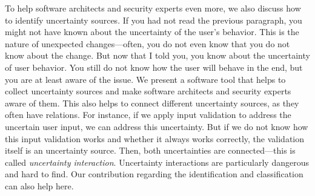 To help software architects and security experts even more, we also discuss how to identify uncertainty sources.
If you had not read the previous paragraph, you might not have known about the uncertainty of the user's behavior.
This is the nature of unexpected changes---often, you do not even know that you do not know about the change.
But now that I told you, you know about the uncertainty of user behavior.
You still do not know how the user will behave in the end, but you are at least aware of the issue.
We present a software tool that helps to collect uncertainty sources and make software architects and security experts aware of them.
This also helps to connect different uncertainty sources, as they often have relations.
For instance, if we apply input validation to address the uncertain user input, we can address this uncertainty.
But if we do not know how this input validation works and whether it always works correctly, the validation itself is an uncertainty source.
Then, both uncertainties are connected---this is called \emph{uncertainty interaction}.
Uncertainty interactions are particularly dangerous and hard to find.
Our contribution regarding the identification and classification can also help here.
